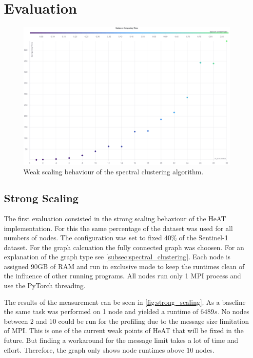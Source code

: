 \section{Evaluation}
\label{sec:evaluation}


\begin{figure}
  \includegraphics[width=0.9\linewidth]{images/weak_scaling_chart.png}
  \caption{Weak scaling behaviour of the spectral clustering algorithm.}\label{fig:weak_scaling}
\end{figure}


\subsection{Strong Scaling}
\label{subsec:strong_scaling}


The first evaluation consisted in the strong scaling behaviour of the \gls{HeAT} implementation.
For this the same percentage of the dataset was used for all numbers of nodes.
The configuration was set to fixed 40\% of the Sentinel-1 dataset.
For the graph calcuation the fully connected graph was choosen. For an explanation of the graph type see \cref{subsec:spectral_clustering}.
Each node is assigned 90GB of \gls{RAM} and run in exclusive mode to keep the runtimes clean of the influence of other running programs.
All nodes run only 1 \gls{MPI} process and use the \gls{PyTorch} threading.

The results of the measurement can be seen in \cref{fig:strong_scaling}. As a baseline the same task was performed on 1 node and yielded a runtime of \(6489s\).
No nodes between \(2\) and \(10\) could be run for the profiling due to the message size limitation of \gls{MPI}. This is one of the current weak points
of \gls{HeAT} that will be fixed in the future.
But finding a workaround for the message limit takes a lot of time and effort.
Therefore, the graph only shows node runtimes above \(10\) nodes.

